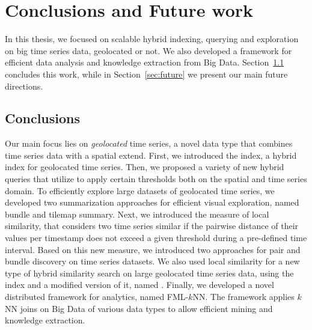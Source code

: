 
\chapter{Conclusions and Future work}
\label{chap:conclusions}

In this thesis, we focused on scalable hybrid indexing, querying and exploration on big time series data, geolocated or not. We also developed a framework for efficient data analysis and knowledge extraction from Big Data. Section~\ref{sec:conc} concludes this work, while in Section~\ref{sec:future} we present our main future directions.

\section{Conclusions}
\label{sec:conc}
Our main focus lies on \textit{geolocated} time series, a novel data type that combines time series data with a spatial extend. First, we introduced the \btsr index, a hybrid index for geolocated time series. Then, we proposed a variety of new hybrid queries that utilize \btsr to apply certain thresholds both on the spatial and time series domain. To efficiently explore large datasets of geolocated time series, we developed two summarization approaches for efficient visual exploration, named bundle and tilemap summary. Next, we introduced the measure of local similarity, that considers two time series similar if the pairwise distance of their values per timestamp does not exceed a given threshold during a pre-defined time interval. Based on this new measure, we introduced two approaches for pair and bundle discovery on time series datasets. We also used local similarity for a new type of hybrid similarity search on large geolocated time series data, using the \btsr index and a modified version of it, named \sbtsr. Finally, we developed a novel distributed framework for analytics, named FML-$k$NN. The framework applies $k$NN joins on Big Data of various data types to allow efficient mining and knowledge extraction.

